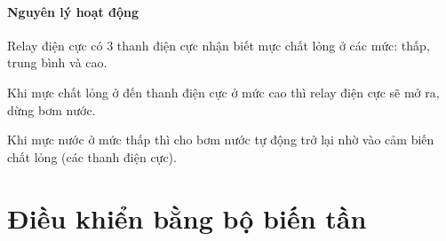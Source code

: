 \documentclass[13pt,a4paper]{extarticle}
\begin{document}
\paragraph{Nguyên lý hoạt động}
\begin{list}{--}{}
\item Relay điện cực có 3 thanh điện cực nhận biết mực chất lỏng ở các mức: thấp, trung bình và cao.
\item Khi mực chất lỏng ở đến thanh điện cực ở mức cao thì relay điện cực sẽ mở ra, dừng bơm nước.
\item Khi mực nước ở mức thấp thì cho bơm nước tự động trở lại nhờ vào cảm biến chất lỏng (các thanh điện cực).
\end{list}
\section{Điều khiển bằng bộ biến tần}
\end{document}
